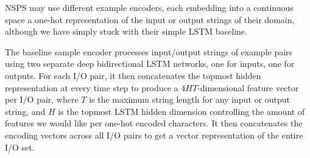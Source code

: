 \documentclass{article} %
\begin{document}

NSPS may use different example encoders,
each embedding into a continuous space a one-hot representation of the input or output strings of their domain,
although we have simply stuck with their simple LSTM baseline.

The baseline sample encoder processes input/output strings of example pairs
using two separate deep bidirectional LSTM networks,
one for inputs, one for outputs.
For each I/O pair, it then concatenates the topmost hidden representation
at every time step to produce a $4HT$-dimensional feature vector per I/O pair,
where $T$ is the maximum string length for any input or output string,
and $H$ is the topmost LSTM hidden dimension controlling the amount
of features we would like per one-hot encoded characters.
It then concatenates the encoding vectors across all I/O pairs
to get a vector representation of the entire I/O set.~\citep{nsps}
\end{document}
